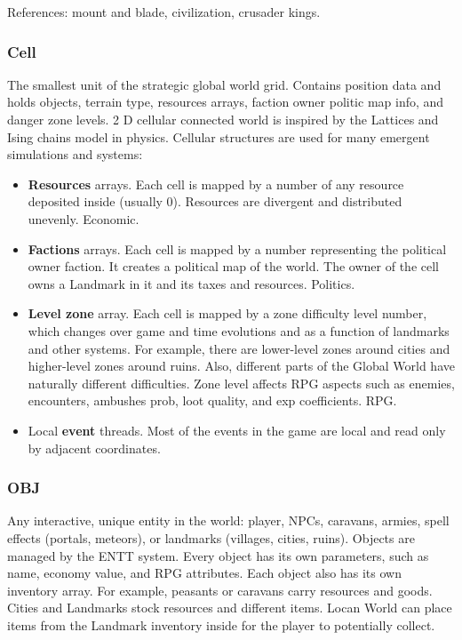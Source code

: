 References: mount and blade, civilization, crusader kings.

\subsubsection{Cell} 

The smallest unit of the strategic global world grid. Contains position data and holds objects, terrain type, resources arrays, faction owner politic map info, and danger zone levels. 2 D cellular connected world is inspired by the Lattices and Ising chains model in physics. Cellular structures are used for many emergent simulations and systems:

\begin{itemize}

\item \textbf{Resources} arrays. Each cell is mapped by a number of any resource deposited inside (usually 0). Resources are divergent and distributed unevenly. Economic.

\item \textbf{Factions} arrays. Each cell is mapped by a number representing the political owner faction. It creates a political map of the world. The owner of the cell owns a Landmark in it and its taxes and resources. Politics.

\item \textbf{Level zone} array. Each cell is mapped by a zone difficulty level number, which changes over game and time evolutions and as a function of landmarks and other systems. For example, there are lower-level zones around cities and higher-level zones around ruins. Also, different parts of the Global World have naturally different difficulties. Zone level affects RPG aspects such as enemies, encounters, ambushes prob, loot quality, and exp coefficients. RPG.

\item Local \textbf{event} threads. Most of the events in the game are local and read only by adjacent coordinates. 

\end{itemize}

\subsubsection{OBJ}  

Any interactive, unique entity in the world: player, NPCs, caravans, armies, spell effects (portals, meteors), or landmarks (villages, cities, ruins). Objects are managed by the ENTT system. Every object has its own parameters, such as name, economy value, and RPG attributes. Each object also has its own inventory array. For example, peasants or caravans carry resources and goods. Cities and Landmarks stock resources and different items. Locan World can place items from the Landmark inventory inside for the player to potentially collect.

